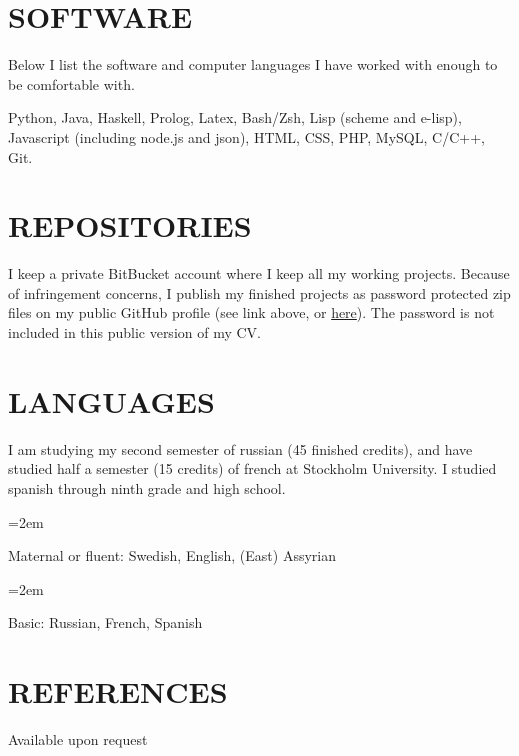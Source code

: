 \documentclass[paper=a4,fontsize=11pt]{scrartcl} %
\newlength{\spacebox}
\newcommand{\NewPart}[1]{\section*{\uppercase{#1}}}
\newcommand{\PersonalEntry}[2]{
		\noindent\hangindent=2em\hangafter=0 %
		\parbox{\spacebox}{        %
		\textit{#1}}		       %
		\hspace{1.5em} #2 \par}    %
\newcommand{\SkillsEntry}[2]{      %
		\noindent\hangindent=2em\hangafter=0 %
		\parbox{\spacebox}{        %
		\textit{#1}}			   %
		\hspace{1.5em} #2 \par}    %
\begin{document}
\NewPart{Software}{}

Below I list the software and computer languages I have worked with enough to be comfortable with.

Python, Java, Haskell, Prolog, Latex, Bash/Zsh, Lisp (scheme and e-lisp), Javascript (including node.js and json), HTML, CSS, PHP, MySQL, C/C++, Git.

\NewPart{Repositories}

I keep a private BitBucket account where I keep all my working projects. Because of infringement concerns, I publish my finished projects as password protected zip files on my public GitHub profile (see link above, or \href{https://github.com/yyzjohann}{here}). The password is not included in this public version of my CV.


\NewPart{Languages}{}

I am studying my second semester of russian (45 finished credits), and have studied half a semester (15 credits) of french at Stockholm University. I studied spanish through ninth grade and high school.

\SkillsEntry{}{Maternal or fluent: Swedish, English, (East) Assyrian}
\SkillsEntry{}{Basic: Russian, French, Spanish}


\NewPart{References}{}
Available upon request
\end{document}
